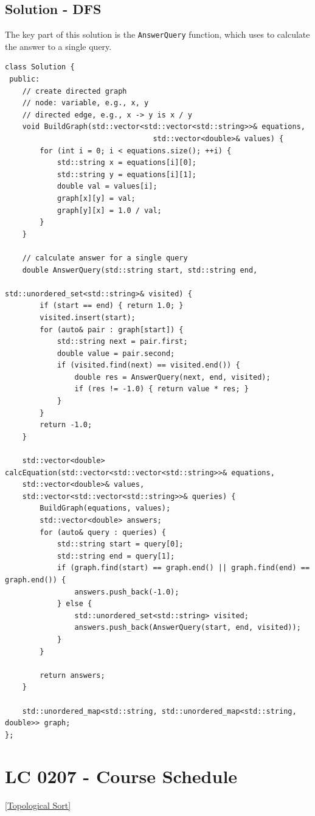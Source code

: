 \subsection*{Solution - DFS}
The key part of this solution is the {\colorbox{CodeBackground}{\lstinline|AnswerQuery|}} function, which uses {\color{blue}{DFS}} to calculate the answer to a single query.
\begin{lstlisting}
class Solution {
 public:
	// create directed graph
	// node: variable, e.g., x, y
	// directed edge, e.g., x -> y is x / y
	void BuildGraph(std::vector<std::vector<std::string>>& equations, 
								  std::vector<double>& values) {
		for (int i = 0; i < equations.size(); ++i) {
			std::string x = equations[i][0];
			std::string y = equations[i][1];
			double val = values[i];
			graph[x][y] = val;
			graph[y][x] = 1.0 / val;
		}
	}
	
	// calculate answer for a single query
	double AnswerQuery(std::string start, std::string end, 
										  std::unordered_set<std::string>& visited) {
		if (start == end) { return 1.0; }
		visited.insert(start);
		for (auto& pair : graph[start]) {
			std::string next = pair.first;
			double value = pair.second;
			if (visited.find(next) == visited.end()) {
				double res = AnswerQuery(next, end, visited);
				if (res != -1.0) { return value * res; }
			}
		}
		return -1.0;
	}
	
	std::vector<double> calcEquation(std::vector<std::vector<std::string>>& equations,
	std::vector<double>& values,
	std::vector<std::vector<std::string>>& queries) {
		BuildGraph(equations, values);
		std::vector<double> answers;
		for (auto& query : queries) {
			std::string start = query[0];
			std::string end = query[1];
			if (graph.find(start) == graph.end() || graph.find(end) == graph.end()) {
				answers.push_back(-1.0);
			} else {
				std::unordered_set<std::string> visited;
				answers.push_back(AnswerQuery(start, end, visited));
			}
		}
		
		return answers;
	}
	
	std::unordered_map<std::string, std::unordered_map<std::string, double>> graph;
};
\end{lstlisting}

\section{LC 0207 - Course Schedule}\label{lc0207}
{\hyperref[sec:topological_sort]{[Topological Sort]}}\\

